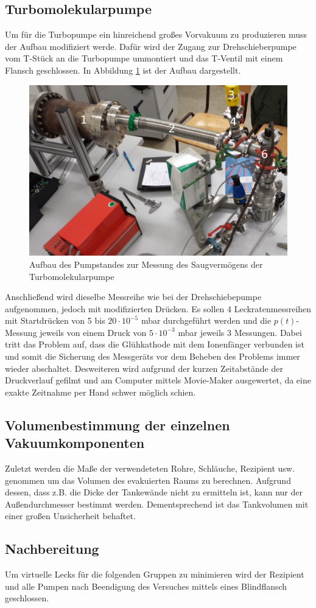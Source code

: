 \subsection{Turbomolekularpumpe}
Um für die Turbopumpe ein hinreichend großes Vorvakuum zu produzieren muss der Aufbau modifiziert werde. Dafür wird der Zugang zur Drehschieberpumpe vom T-Stück an die Turbopumpe ummontiert und das T-Ventil mit einem Flansch geschlossen. In Abbildung \ref{fig:Turbo} ist der Aufbau dargestellt.
\begin{figure}[htpb]
  \centering
  \includegraphics[width=\textwidth]{picture/Aufgabe2.jpg}
  \caption{Aufbau des Pumpstandes zur Messung des Saugvermögens der Turbomolekularpumpe}
  \label{fig:Turbo}
\end{figure}
Anschließend wird dieselbe Messreihe wie bei der Drehschiebepumpe aufgenommen, jedoch mit modifizierten Drücken. Es sollen 4 Leckratenmessreihen mit Startdrücken von 5 bis $20 \cdot 10^{-5}$ mbar durchgeführt werden und die $p(t)$-Messung jeweils von einem Druck von $5 \cdot 10^{-3}$ mbar jeweils 3 Messungen. Dabei tritt das Problem auf, dass die Glühkathode mit dem Ionenfänger verbunden ist und somit die Sicherung des Messgeräts vor dem Beheben des Problems immer wieder abschaltet. Desweiteren wird aufgrund der kurzen Zeitabstände der Druckverlauf gefilmt und am Computer mittels Movie-Maker ausgewertet, da eine exakte Zeitnahme per Hand schwer möglich schien.

\subsection{Volumenbestimmung der einzelnen Vakuumkomponenten}
Zuletzt werden die Maße der verwendeteten Rohre, Schläuche, Rezipient usw. genommen um das Volumen des evakuierten Raums zu berechnen. Aufgrund dessen, dass z.B. die Dicke der Tankewände nicht zu ermitteln ist, kann nur der Außendurchmesser bestimmt werden. Dementsprechend ist das Tankvolumen mit einer großen Unsicherheit behaftet. 
\subsection{Nachbereitung}
Um virtuelle Lecks für die folgenden Gruppen zu minimieren wird der Rezipient und alle Pumpen nach Beendigung des Versuches mittels eines Blindflansch geschlossen.
